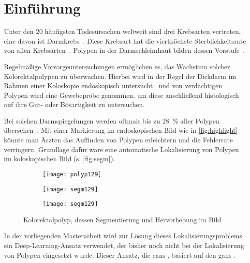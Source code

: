 \chapter{Einführung}

Unter den 20 häufigsten Todesursachen weltweit sind drei Krebsarten vertreten, eine davon ist Darmkrebs~\cite{Lozano.2012}.
Diese Krebsart hat die vierthöchste Sterblichkeitsrate von allen Krebsarten~\cite{Ferlay.2012}.
Polypen in der Darmschleimhaut bilden dessen Vorstufe~\cite{Kumar.2005}.

Regelmäßige Vorsorgeuntersuchungen ermöglichen es, das Wachstum solcher Kolorektalpolypen zu überwachen.
Hierbei wird in der Regel der Dickdarm im Rahmen einer Koloskopie endoskopisch untersucht~\cite{Kumar.2005} und von verdächtigen Polypen wird eine Gewebeprobe genommen, um diese anschließend histologisch auf ihre Gut- oder Bösartigkeit zu untersuchen.

Bei solchen Darmspiegelungen werden oftmals bis zu 28~\% aller Polypen übersehen~\cite{Leufkens.2012}.
Mit einer Markierung im endoskopischen Bild wie in \autoref{fig:highlight} könnte man Ärzten das Auffinden von Polypen erleichtern und die Fehlerrate verringern.
Grundlage dafür wäre eine automatische Lokalisierung von Polypen im koloskopischen Bild (s. \autoref{fig:segm}).

\begin{figure}[ht]
	\begin{subfigure}{.3\textwidth}
		\centering
		\texttt{[image: polyp129]}
		\caption{}
		\label{fig:polyp}
	\end{subfigure}
	\begin{subfigure}{.3\textwidth}
		\centering
		\texttt{[image: segm129]}
		\caption{}
		\label{fig:segm}
	\end{subfigure}
	\begin{subfigure}{.3\textwidth}
		\centering
		\texttt{[image: segm129]}
		\caption{}
		\label{fig:highlight}
	\end{subfigure}
	\caption{Kolorektalpolyp, dessen Segmentierung und Hervorhebung im Bild}
	\label{fig:polypseg}
\end{figure}

In der vorliegenden Masterarbeit wird zur Lösung dieses Lokalisierungsproblems ein Deep-Learning-Ansatz verwendet, der bisher noch nicht bei der Lokalisierung von Polypen eingesetzt wurde.
Dieser Ansatz, die \glspl{can} \cite{Isola.2017}, basiert auf den \glspl{gan} \cite{Goodfellow.2014}.

